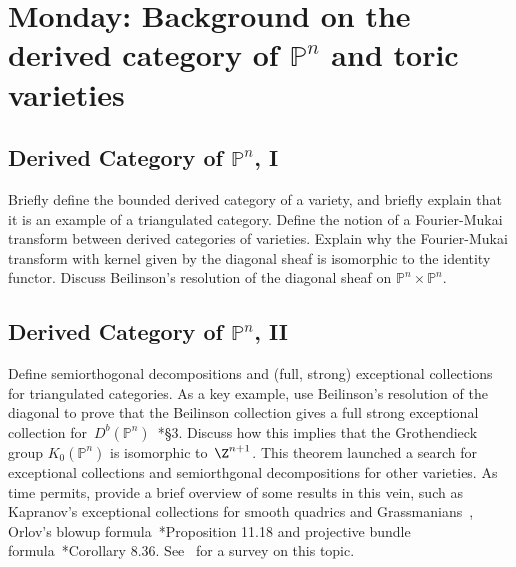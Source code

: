 \documentclass[11pt]{amsart}
\numberwithin{equation}{section}
\theoremstyle{definition}
\theoremstyle{remark}
\newcommand{\PP}{\mathbb P}
\begin{document}
\section{Monday: Background on the derived category of $\PP^n$ and toric varieties}

\subsection{Derived Category of $\PP^n$, I}
Briefly define the bounded derived category of a variety, and briefly explain that it is an example of a triangulated category. Define the notion of a Fourier-Mukai transform between derived categories of varieties. Explain why the Fourier-Mukai transform with kernel given by the diagonal sheaf is isomorphic to the identity functor. Discuss Beilinson's resolution of the diagonal sheaf on $\PP^n \times \PP^n$.

 

\subsection{Derived Category of $\PP^n$, II}
Define semiorthogonal decompositions and (full, strong) exceptional collections for triangulated categories. As a key example, use Beilinson's resolution of the diagonal to prove that the Beilinson collection gives a full strong exceptional collection for~$D^b(\PP^n)$~\cite{caldararu}*{\S 3}. Discuss how this implies that the Grothendieck group $K_0(\PP^n)$ is isomorphic to~$\Z^{n+1}$. %
This theorem launched a search for exceptional collections and semiorthgonal decompositions for other varieties.  As time permits, provide a brief overview of some results in this vein, such as Kapranov's exceptional collections for smooth quadrics and Grassmanians~\cite{kapranov}, 
Orlov's blowup formula~\cite{huybrechts}*{Proposition 11.18} and projective bundle formula~\cite{huybrechts}*{Corollary 8.36}. See~\cite{kuznetsov} for a survey on this topic.
\end{document}
